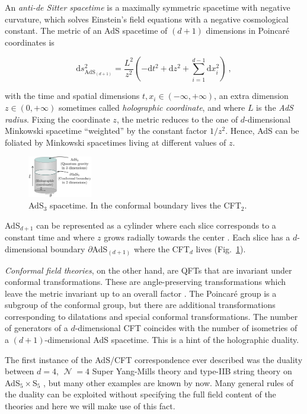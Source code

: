 \documentclass[twocolumn]{revtex4}
\providecommand{\eq}[2]{
    \begin{equation}
        #2
    \label{eq:#1}
    \end{equation}
}
\DeclareMathOperator{\calN}{\mathcal{N}}
\begin{document}
An \emph{anti-de Sitter spacetime} is a maximally symmetric spacetime with negative curvature, which solves Einstein's field equations with a negative cosmological constant. The metric of an AdS spacetime of $(d+1)$ dimensions in Poincar\'e coordinates is 
\eq{AdS_PP-metric}{
    \mathrm{d} s_{\text{AdS}_{(d+1)}}^2 = \frac{L^2}{z^2} \left( -\mathrm{d} t^2 + \mathrm{d} z^2 + \sum_{i=1}^{d-1} \mathrm{d} x_i^2 \right) \ ,
}
with the time and spatial dimensions $t , x_i \in (-\infty,+\infty)$, an extra dimension $z \in (0,+\infty)$ sometimes called \emph{holographic coordinate}, and where $L$ is the \emph{AdS radius}. Fixing the coordinate $z$, the metric reduces to the one of $d$-dimensional Minkowski spacetime ``weighted'' by the constant factor $1/z^2$. Hence, AdS can be foliated by Minkowski spacetimes living at different values of $z$.


\begin{figure}
    \centering
    \includegraphics[width=0.25\textwidth]{../imatges/AdS_Cylindric.png}
\caption{AdS$_3$ spacetime. In the conformal boundary lives the CFT$_2$.}
\label{fig:AdS}
\end{figure}

AdS$_{d+1}$ can be represented as a cylinder where each slice corresponds to a constant time and where  $z$ grows radially towards the center \cite{hawking_large_2008}. Each slice has a $d$-dimensional boundary $\partial$AdS$_{(d+1)}$ where the CFT$_d$ lives (Fig.~\ref{fig:AdS}).

\emph{Conformal field theories}, on the other hand, are QFTs that are invariant under conformal transformations. These are angle-preserving transformations which leave the metric invariant up to an overall factor \cite{di_francesco_conformal_1997}. The Poincar\'e group is a subgroup of the conformal group, but there are additional transformations corresponding to dilatations and special conformal transformations. The number of generators of a $d$-dimensional CFT coincides with the number of isometries of a $(d+1)$-dimensional AdS spacetime. This is a hint of the holographic duality.

The first instance of the AdS/CFT correspondence ever described was the duality between $d=4$, $\calN=4$ Super Yang-Mills theory and type-IIB string theory on AdS$_5 \times $S$_5$ \cite{maldacena_large_1999}, but many other examples are known by now. Many general rules of the duality can be exploited without specifying the full field content of the theories and here we will make use of this fact.
\end{document}
